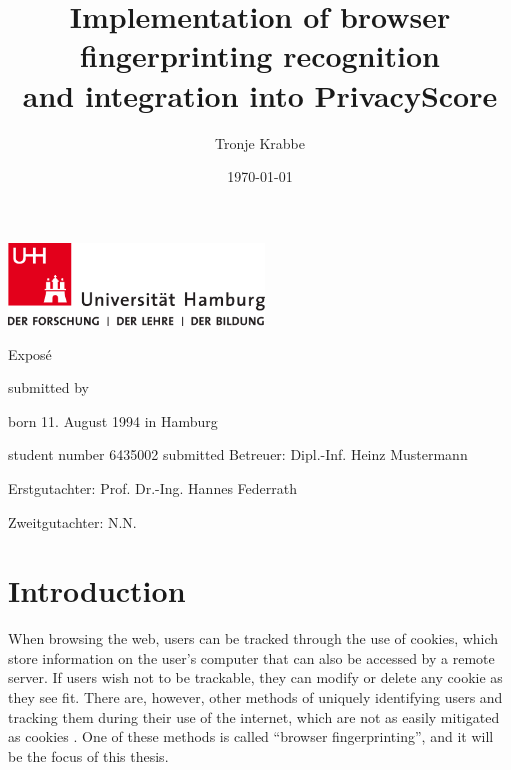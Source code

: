 \documentclass[
    fontsize=12pt,
    headings=small,
    parskip=half,
    bibliography=totoc,
    numbers=noenddot,
    open=any
    ]{scrreprt}
\title{
    \large Implementation of browser fingerprinting recognition \\
    and integration into PrivacyScore
}
\author{Tronje Krabbe}
\date{\today}
\begin{document}
\hypersetup{hidelinks}


\newpage
\thispagestyle{empty}
\begin{titlepage}%
\includegraphics[width=6.8cm]{../images/up-uhh-logo-u-2010-u-farbe-u-rgb.pdf}
\begin{center}\Large
    \vfill
    Exposé
	\vfill
	\makeatletter
	{\Large\textsf{\textbf{\@title}}\par}
	\makeatother
	\vfill
    submitted by
	\par\bigskip
	\makeatletter
	{\@author} \par
	\makeatother
	born 11. August 1994 in Hamburg \par
	student number 6435002
	\vfill
	\makeatletter
	submitted {\@date}
	\makeatother
	\vfill
	Betreuer: Dipl.-Inf. Heinz Mustermann \par
	Erstgutachter: Prof. Dr.-Ing. Hannes Federrath \par
	Zweitgutachter: N.N.
\end{center}
\end{titlepage}%

\tableofcontents

\chapter{Introduction} %

When browsing the web, users can be tracked through the use of cookies, which store information on the user's computer
that can also be accessed by a remote server.
If users wish not to be trackable, they can modify or delete any cookie as they see fit.
There are, however, other methods of uniquely identifying users and tracking them during their use of the internet,
which are not as easily mitigated as cookies \cite{am_i_unique}. One of these methods is called ``browser fingerprinting'',
and it will be the focus of this thesis.
\end{document}
